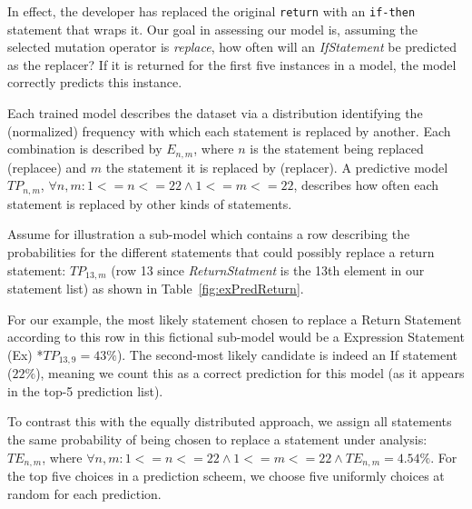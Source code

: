 \documentclass[conference]{IEEEtran}
\begin{document}
In effect, the developer has replaced the original \texttt{return} with an
\texttt{if-then} statement that wraps it.  Our goal in assessing our model is,
assuming the selected mutation operator 
is \emph{replace}, how often will an \emph{IfStatement} be predicted as the
replacer? If it is returned for the first five instances in a model, the model
correctly predicts this instance.  

Each trained model describes the dataset via
a distribution identifying the (normalized) frequency with which each statement is replaced 
by another. Each combination is described by 
$E_{n,m}$, 
where $n$ is the statement being replaced (replacee) and $m$ the statement it is 
replaced by (replacer).  A predictive model $TP_{n,m}$, $\forall n,m: 1<=n<=22 \land 1<=m<=22$, 
describes how often each statement is replaced by 
other kinds of statements. 

Assume for illustration a sub-model which contains a row describing the 
probabilities for the different statements that could possibly replace a return 
statement: $TP_{13,m}$ (row 13 since \emph{ReturnStatment} is the 13th element 
in our statement list) as shown in 
Table~\ref{fig:exPredReturn}.

%
For our example, the most
likely statement chosen to replace a Return Statement according to this row in 
this fictional sub-model would be a Expression Statement (Ex) *$TP_{13,9} = 43\%$). 
The second-most likely candidate is indeed an If statement ($22\%$),
meaning we count this as a correct prediction for this model (as it appears in
the top-5 prediction list). 

To contrast this with the equally distributed approach,
we assign all statements the same probability of being chosen to replace 
a statement under analysis:
$TE_{n,m}$, where $\forall n,m: 1<=n<=22 \land 1<=m<=22 \land TE_{n,m} = 4.54\%$. 
For the top five choices in a prediction scheem, we choose five uniformly choices at
random for each prediction. 


\end{document}
